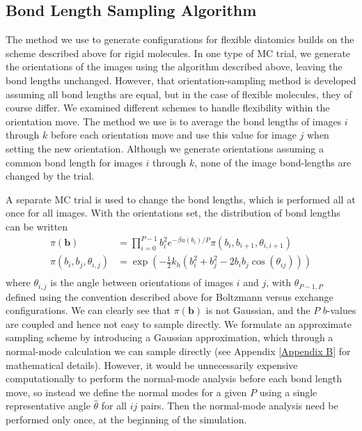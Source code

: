     \subsection{Bond Length Sampling Algorithm}
    \label{subsec:blMove}
        The method we use to generate configurations for flexible diatomics builds on the scheme described above for rigid molecules. In one type of MC trial, we generate the orientations of the images using the algorithm described above, leaving the bond lengths unchanged. However, that orientation-sampling method is developed assuming all bond lengths are equal, but in the case of flexible molecules, they of course differ. We examined different schemes to handle flexibility within the orientation move. The method we use is to average the bond lengths of images $i$ through $k$ before each orientation move and use this value for image $j$ when setting the new orientation. Although we generate orientations assuming a common bond length for images $i$ through $k$, none of the image bond-lengths are changed by the trial.

        A separate MC trial is used to change the bond lengths, which is performed all at once for all images. With the orientations set, the distribution of bond lengths can be written
        \begin{equation}
            \begin{aligned}
                \pi(\mathbf{b}) &= \displaystyle\prod\limits_{i=0}^{P-1} b_i^2 e^{-\beta u(b_i)/P} \pi(b_i,b_{i+1},\theta_{i,i+1}) \\
                \pi(b_i,b_j,\theta_{i,j}) &= \exp\left(-\frac{1}{2}  k_h  \left( b_i^2 + b_j^2 - 2  b_i  b_j  \cos (\theta_{ij}) \right)\right)\\
            \end{aligned}
        \end{equation}
        where $\theta_{i,j}$ is the angle between orientations of images $i$ and $j$, with $\theta_{P-1,P}$ defined using the convention described above for Boltzmann versus exchange configurations.
        We can clearly see that $\pi(\mathbf{b})$ is not Gaussian, and the $P$ $b$-values are coupled and hence not easy to sample directly. We formulate an approximate sampling scheme by introducing a Gaussian approximation, which through a normal-mode calculation we can sample directly (see Appendix \ref{Appendix B} for mathematical details). However, it would be unnecessarily expensive computationally to perform the normal-mode analysis before each bond length move, so instead we define the normal modes for a given $P$ using a single representative angle $\hat \theta$ for all $ij$ pairs. Then the normal-mode analysis need be performed only once, at the beginning of the simulation.


